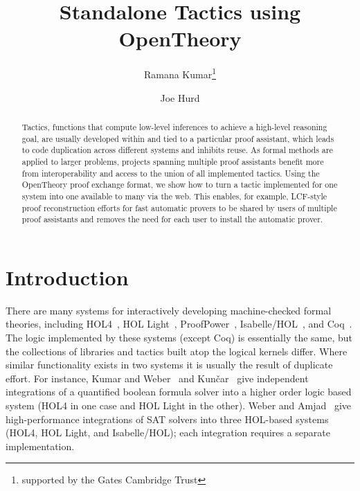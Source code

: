 \documentclass{llncs}
\begin{document}
\title{Standalone Tactics using OpenTheory}

\author{Ramana Kumar\thanks{supported by the Gates Cambridge Trust}\and Joe Hurd}


\maketitle

\begin{abstract}
Tactics, functions that compute low-level inferences to achieve a high-level reasoning goal, are usually developed within and tied to a particular proof assistant, which leads to code duplication across different systems and inhibits reuse.
As formal methods are applied to larger problems, projects spanning multiple proof assistants benefit more from interoperability and access to the union of all implemented tactics.
Using the OpenTheory proof exchange format, we show how to turn a tactic implemented for one system into one available to many via the web.
This enables, for example, LCF-style proof reconstruction efforts for fast automatic provers to be shared by users of multiple proof assistants and removes the need for each user to install the automatic prover.
\end{abstract}

\section{Introduction}
There are many systems for interactively developing machine-checked formal theories, including HOL4~\cite{slind08brief}, HOL Light~\cite{DBLP:conf/tphol/Harrison09a}, ProofPower~\cite{ProofPower}, Isabelle/HOL~\cite{wenzel08isabelle}, and Coq~\cite{bertot08short}.
The logic implemented by these systems (except Coq) is essentially the same, but the collections of libraries and tactics built atop the logical kernels differ.
Where similar functionality exists in two systems it is usually the result of duplicate effort.
For instance, Kumar and Weber~\cite{DBLP:conf/itp/KumarW11} and Kun\v{c}ar~\cite{DBLP:conf/itp/Kuncar11} give independent integrations of a quantified boolean formula solver into a higher order logic based system (HOL4 in one case and HOL Light in the other).
Weber and Amjad~\cite{weber09efficiently} give high-performance integrations of SAT solvers into three HOL-based systems (HOL4, HOL Light, and Isabelle/HOL); each integration requires a separate implementation.
\end{document}

